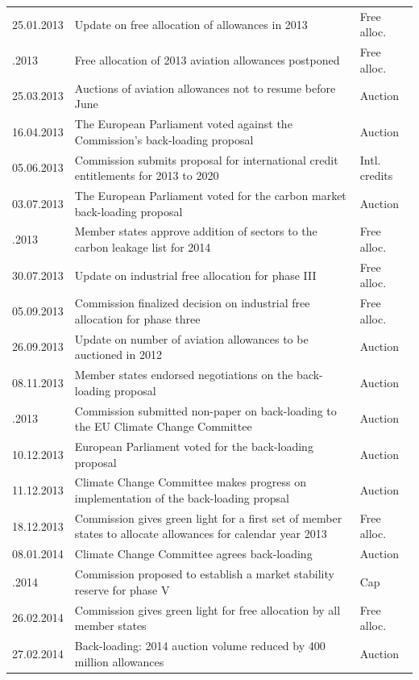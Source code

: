 \documentclass[
]{article}
\begin{document}
\begin{longtable}[l]{l>{\raggedright\arraybackslash}p{35em}l}
25.01.2013 & Update on free allocation of allowances in 2013 & Free alloc.\\
\addlinespace
28.02.2013 & Free allocation of 2013 aviation allowances postponed & Free alloc.\\
25.03.2013 & Auctions of aviation allowances not to resume before June & Auction\\
16.04.2013 & The European Parliament voted against the Commission’s back-loading proposal & Auction\\
05.06.2013 & Commission submits proposal for international credit entitlements for 2013 to 2020 & Intl. credits\\
03.07.2013 & The European Parliament voted for the carbon market back-loading proposal & Auction\\
\addlinespace
10.07.2013 & Member states approve addition of sectors to the carbon leakage list for 2014 & Free alloc.\\
30.07.2013 & Update on industrial free allocation for phase III & Free alloc.\\
05.09.2013 & Commission finalized decision on industrial free allocation for phase three & Free alloc.\\
26.09.2013 & Update on number of aviation allowances to be auctioned in 2012 & Auction\\
08.11.2013 & Member states endorsed negotiations on the back-loading proposal & Auction\\
\addlinespace
21.11.2013 & Commission submitted non-paper on back-loading to the EU Climate Change Committee & Auction\\
10.12.2013 & European Parliament voted for the back-loading proposal & Auction\\
11.12.2013 & Climate Change Committee makes progress on implementation of the back-loading propsal & Auction\\
18.12.2013 & Commission gives green light for a first set of member states to allocate allowances for calendar year 2013 & Free alloc.\\
08.01.2014 & Climate Change Committee agrees back-loading & Auction\\
\addlinespace
22.01.2014 & Commission proposed to establish a market stability reserve for phase V & Cap\\
26.02.2014 & Commission gives green light for free allocation by all member states & Free alloc.\\
27.02.2014 & Back-loading: 2014 auction volume reduced by 400 million allowances & Auction\\

\end{longtable}
\end{document}
